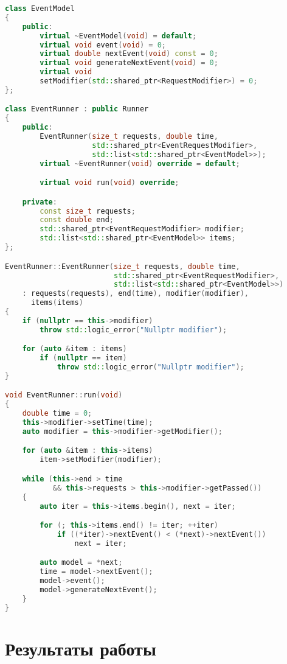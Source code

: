\begin{lstlisting}[caption={Реализация событийного подхода}, language=c++]
class EventModel
{
    public:
        virtual ~EventModel(void) = default;
        virtual void event(void) = 0;
        virtual double nextEvent(void) const = 0;
        virtual void generateNextEvent(void) = 0;
        virtual void
        setModifier(std::shared_ptr<RequestModifier>) = 0;
};

class EventRunner : public Runner
{
    public:
        EventRunner(size_t requests, double time,
                    std::shared_ptr<EventRequestModifier>,
                    std::list<std::shared_ptr<EventModel>>);
        virtual ~EventRunner(void) override = default;

        virtual void run(void) override;

    private:
        const size_t requests;
        const double end;
        std::shared_ptr<EventRequestModifier> modifier;
        std::list<std::shared_ptr<EventModel>> items;
};

EventRunner::EventRunner(size_t requests, double time,
                         std::shared_ptr<EventRequestModifier>,
                         std::list<std::shared_ptr<EventModel>>)
    : requests(requests), end(time), modifier(modifier),
      items(items)
{
    if (nullptr == this->modifier)
        throw std::logic_error("Nullptr modifier");

    for (auto &item : items)
        if (nullptr == item)
            throw std::logic_error("Nullptr modifier");
}

void EventRunner::run(void)
{
    double time = 0;
    this->modifier->setTime(time);
    auto modifier = this->modifier->getModifier();

    for (auto &item : this->items)
        item->setModifier(modifier);

    while (this->end > time
           && this->requests > this->modifier->getPassed())
    {
        auto iter = this->items.begin(), next = iter;

        for (; this->items.end() != iter; ++iter)
            if ((*iter)->nextEvent() < (*next)->nextEvent())
                next = iter;

        auto model = *next;
        time = model->nextEvent();
        model->event();
        model->generateNextEvent();
    }
}
\end{lstlisting}


\section*{Результаты работы}

